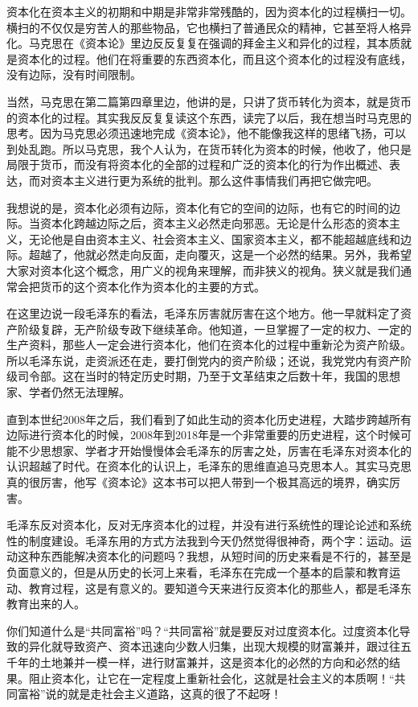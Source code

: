 \documentclass[UTF8, 12pt, a4paper]{ctexrep}
\begin{document}
资本化在资本主义的初期和中期是非常非常残酷的，因为资本化的过程横扫一切。横扫的不仅仅是穷苦人的那些物品，它也横扫了普通民众的精神，它甚至将人格异化。马克思在《资本论》里边反反复复在强调的拜金主义和异化的过程，其本质就是资本化的过程。他们在将重要的东西资本化，而且这个资本化的过程没有底线，没有边际，没有时间限制。

当然，马克思在第二篇第四章里边，他讲的是，只讲了货币转化为资本，就是货币的资本化的过程。其实我反反复复读这个东西，读完了以后，我在想当时马克思的思考。因为马克思必须迅速地完成《资本论》，他不能像我这样的思绪飞扬，可以到处乱跑。所以马克思，我个人认为，在货币转化为资本的时候，他收了，他只是局限于货币，而没有将资本化的全部的过程和广泛的资本化的行为作出概述、表达，而对资本主义进行更为系统的批判。那么这件事情我们再把它做完吧。

我想说的是，资本化必须有边际，资本化有它的空间的边际，也有它的时间的边际。当资本化跨越边际之后，资本主义必然走向邪恶。无论是什么形态的资本主义，无论他是自由资本主义、社会资本主义、国家资本主义，都不能超越底线和边际。超越了，他就必然走向反面，走向覆灭，这是一个必然的结果。另外，我希望大家对资本化这个概念，用广义的视角来理解，而非狭义的视角。狭义就是我们通常会把货币的这个资本化作为资本化的主要的方式。

在这里边说一段毛泽东的看法，毛泽东厉害就厉害在这个地方。他一早就料定了资产阶级复辟，无产阶级专政下继续革命。他知道，一旦掌握了一定的权力、一定的生产资料，那些人一定会进行资本化，他们在资本化的过程中重新沦为资产阶级。所以毛泽东说，走资派还在走，要打倒党内的资产阶级；还说，我党党内有资产阶级司令部。这在当时的特定历史时期，乃至于文革结束之后数十年，我国的思想家、学者仍然无法理解。

直到本世纪2008年之后，我们看到了如此生动的资本化历史进程，大踏步跨越所有边际进行资本化的时候，2008年到2018年是一个非常重要的历史进程，这个时候可能不少思想家、学者才开始慢慢体会毛泽东的厉害之处，厉害在毛泽东对资本化的认识超越了时代。在资本化的认识上，毛泽东的思维直追马克思本人。其实马克思真的很厉害，他写《资本论》这本书可以把人带到一个极其高远的境界，确实厉害。

毛泽东反对资本化，反对无序资本化的过程，并没有进行系统性的理论论述和系统性的制度建设。毛泽东用的方式方法我到今天仍然觉得很神奇，两个字：运动。运动这种东西能解决资本化的问题吗？我想，从短时间的历史来看是不行的，甚至是负面意义的，但是从历史的长河上来看，毛泽东在完成一个基本的启蒙和教育运动、教育过程，这是有意义的。要知道今天来进行反资本化的那些人，都是毛泽东教育出来的人。

你们知道什么是“共同富裕”吗？“共同富裕”就是要反对过度资本化。过度资本化导致的异化就导致资产、资本迅速向少数人归集，出现大规模的财富兼并，跟过往五千年的土地兼并一模一样，进行财富兼并，这是资本化的必然的方向和必然的结果。阻止资本化，让它在一定程度上重新社会化，这就是社会主义的本质啊！“共同富裕”说的就是走社会主义道路，这真的很了不起呀！
\end{document}
